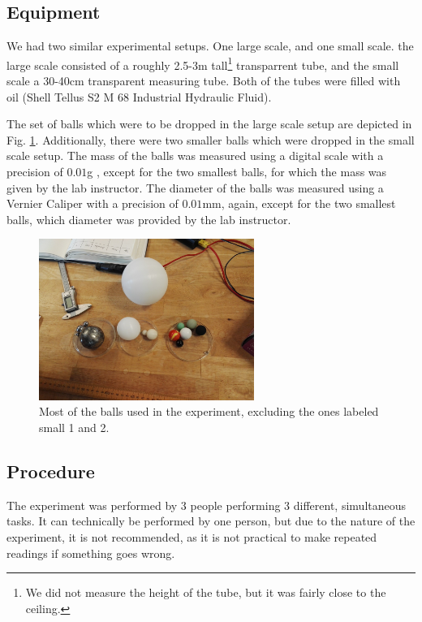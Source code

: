 \documentclass[11pt,a4paper]{article}
\begin{document}
  \subsection{Equipment}

    We had two similar experimental setups. One large scale, and one small scale. the large scale consisted of a roughly 2.5-3m tall\footnote{We did not measure the height of the tube, but it was fairly close to the ceiling.} transparrent tube, and the small scale a 30-40cm transparent measuring tube. Both of the tubes were filled with oil (Shell Tellus S2 M 68 Industrial Hydraulic Fluid\cite{_shell_????}).

    The set of balls which were to be dropped in the large scale setup are depicted in Fig. \ref{fig:balls}. Additionally, there were two smaller balls which were dropped in the small scale setup. The mass of the balls was measured using a digital scale with a precision of $0.01$g \cite{_proscale_????}, except for the two smallest balls, for which the mass was given by the lab instructor. The diameter of the balls was measured using a Vernier Caliper with a precision of $0.01$mm, again, except for the two smallest balls, which diameter was provided by the lab instructor.

    \begin{figure}[H]
      \center
      \includegraphics[width=7cm]{scripts/figs/IMG_20180321_131204.jpg}
      \caption{Most of the balls used in the experiment, excluding the ones labeled small 1 and 2.}
      \label{fig:balls}
    \end{figure}

  \subsection{Procedure}
    The experiment was performed by 3 people performing 3 different, simultaneous tasks. It can technically be performed by one person, but due to the nature of the experiment, it is not recommended, as it is not practical to make repeated readings if something goes wrong.
\end{document}
